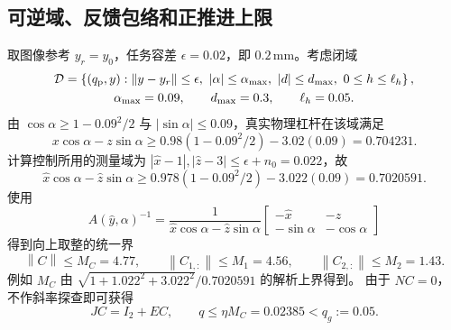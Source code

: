 \documentclass[11pt,a4paper]{article}
\numberwithin{equation}{section}
\theoremstyle{definition}
\newcommand{\norm}[1]{\left\lVert#1\right\rVert}
\begin{document}
\subsection{可逆域、反馈包络和正推进上限}
取图像参考 $y_r=y_0$，任务容差 $\epsilon=0.02$，即 $0.2\,\mathrm{mm}$。考虑闭域
\begin{equation}
 \begin{gathered}
 \mathcal D=\left\{(q_{\rm p},y):
 \norm{y-y_r}\le\epsilon,
 \ |\alpha|\le\alpha_{\max},
 \ |d|\le d_{\max},
 \ 0\le h\le\ell_h
 \right\},\\
 \alpha_{\max}=0.09,
 \qquad d_{\max}=0.3,
 \qquad\ell_h=0.05.
 \end{gathered}
 \label{rev:example-domain}
\end{equation}
由 $\cos\alpha\ge1-0.09^2/2$ 与 $|\sin\alpha|\le0.09$，真实物理杠杆在该域满足
\begin{equation}
 x\cos\alpha-z\sin\alpha
 \ge0.98(1-0.09^2/2)-3.02(0.09)
 =0.704231.
 \label{rev:example-physical-lever}
\end{equation}
计算控制所用的测量域为
$|\widehat x-1|,|\widehat z-3|\le\epsilon+n_0=0.022$，故
\begin{equation}
 \widehat x\cos\alpha-\widehat z\sin\alpha
 \ge0.978(1-0.09^2/2)-3.022(0.09)
 =0.7020591.
 \label{rev:example-measured-lever}
\end{equation}
使用
\begin{equation}
 A(\widehat y,\alpha)^{-1}
 =\frac1{\widehat x\cos\alpha-\widehat z\sin\alpha}
 \begin{bmatrix}-\widehat x&-\widehat z\\-\sin\alpha&-\cos\alpha\end{bmatrix}
 \label{rev:example-inverse}
\end{equation}
得到向上取整的统一界
\begin{equation}
 \norm{C}\le M_C=4.77,
 \qquad\norm{C_{1,:}}\le M_1=4.56,
 \qquad\norm{C_{2,:}}\le M_2=1.43.
 \label{rev:example-inverse-bounds}
\end{equation}
例如 $M_C$ 由
$\sqrt{1+1.022^2+3.022^2}/0.7020591$ 的解析上界得到。
由于 $NC=0$，不作斜率探查即可获得
\begin{equation}
 JC=I_2+EC,
 \qquad q\le\eta M_C=0.02385<q_g:=0.05.
 \label{rev:example-zero-probe-certificate}
\end{equation}
\end{document}
